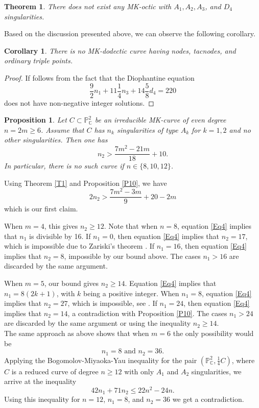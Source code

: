 \documentclass[11pt]{amsart}
\theoremstyle{plain}
\newtheorem{theorem}[thm]{Theorem}
\newtheorem{proposition}[thm]{Proposition}
\newtheorem{corollary}[thm]{Corollary}
\theoremstyle{definition}
\numberwithin{equation}{section}
\begin{document}
\begin{theorem}
\label{thmn=8}
There does not exist any MK-octic with $A_{1}, A_{2},A_{3}$, and $D_{4}$ singularities. 
\end{theorem}
Based on the discussion presented above, we can observe the following corollary.
\begin{corollary}
\label{corn=10}
There is no MK-dodectic curve having nodes, tacnodes, and ordinary triple points. 
\end{corollary}
\begin{proof}
If follows from the fact that the Diophantine equation 
$$\frac{9}{2}n_{1} + 11\frac{1}{4}n_{3}+14\frac{5}{8}d_{4} = 220$$
does not have non-negative integer solutions.
\end{proof}


\begin{proposition}
\label{P11}
Let $C \subset \mathbb{P}^{2}_{\mathbb{C}}$ be an irreducible MK-curve of even degree $n=2m\geq 6$. Assume that $C$ has $n_k$ singularities of type $A_k$ for $k=1,2$ and no other singularities. Then one has
$$n_2> \frac{7m^2-21m}{18}+10.$$
In particular, there is no such curve if $n\in \{8,10,12\}$.
\end{proposition}

\proof
Using Theorem \ref{T1} and Proposition \ref{P10}, we have
$$2n_2 > \frac{7m^2-3m}{9}+20-2m$$
which is our first claim. 

When $m=4$, this gives $n_2 \geq 12$.
Note that
when $n=8$, equation \eqref{Eq4} implies that $n_1$ is divisible by 16.
If $n_1=0$, then equation \eqref{Eq4} implies that $n_2=17$, which is impossible due to Zariski's theorem \cite{Zar}. If $n_1=16$, then equation \eqref{Eq4} implies that $n_2=8$, impossible by our bound above. The cases $n_1 >16$ are discarded by the same argument.

When $m=5$, our bound gives $n_2 \geq 14$. Equation \eqref{Eq4} implies that $n_1=8(2k+1)$, with $k$ being a positive integer. When $n_1=8$,
equation \eqref{Eq4} implies that $n_2=27$, which is impossible, see \cite[Table on p. 25]{GS}. If $n_1=24$, then equation \eqref{Eq4} implies that $n_2=14$, a contradiction with Proposition \ref{P10}.
The cases $n_1 >24$ are discarded by the same argument or using the inequality $n_2 \geq 14$. \\
The same approach as above shows that when $m=6$ the only possibility would  be
$$ n_1=8 \text{ and } n_2=36.$$
Applying the Bogomolov-Miyaoka-Yau inequality for the pair $(\mathbb{P}^{2}_{\mathbb{C}},\frac{1}{4}C)$, where $C$ is a reduced curve of degree $n\geq12$ with only $A_{1}$ and $A_{2}$ singularities, we arrive at the inequality
\begin{equation}
42n_{1} + 71n_{2} \leq 22n^{2}-24n.
\end{equation}
Using this inequality for $n=12$, $n_{1}=8$, and $n_{2}=36$ we get a contradiction. 
\endproof
\end{document}
